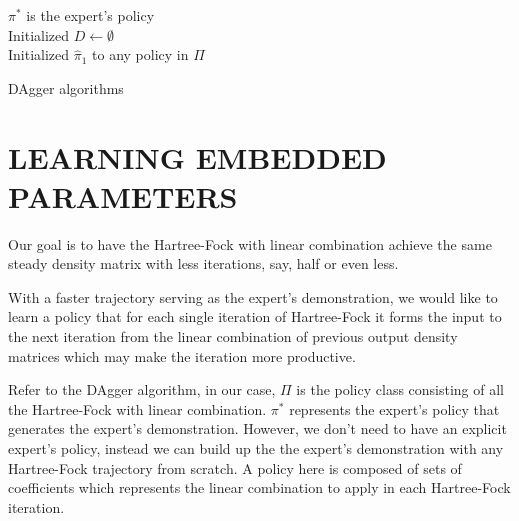 \documentclass[twoside]{article}
\begin{document}
\begin{algorithm}[htb]
 \label{alg:DAgger}
 $\pi^*$  is the expert’s policy \\
 Initialized $D \leftarrow \emptyset$ \\
 Initialized $\hat{\pi}_1$ to any policy in $\Pi$ \\
 \caption{DAgger algorithms}
\end{algorithm}



\section{LEARNING EMBEDDED PARAMETERS}

Our goal is to have the Hartree-Fock with linear combination achieve the same steady density matrix with less iterations, say, half or even less.  



% 

With a faster trajectory serving as the expert's demonstration, we would like to learn a policy that for each single iteration of Hartree-Fock it forms the input to the next iteration from the linear combination of previous output density matrices which may make the iteration more productive.   

Refer to the DAgger algorithm, in our case, $\Pi$ is the policy class consisting of all the Hartree-Fock with linear combination. $\pi^*$ represents the expert's policy that generates the expert's demonstration. However, we don't need to have an explicit expert's policy, instead we can build up the the expert's demonstration with any Hartree-Fock trajectory from scratch. A policy here is composed of sets of coefficients which represents the linear combination to apply in each Hartree-Fock iteration. 
\end{document}
